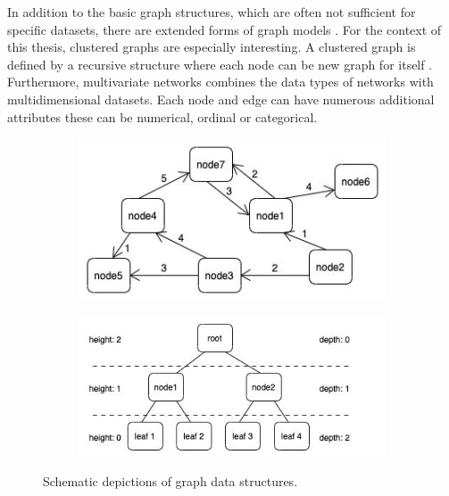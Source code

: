 In addition to the basic graph structures, which are often not sufficient for specific datasets, there are extended forms of graph models \cite{bertault_algorithm_1999}. 
For the context of this thesis, clustered graphs are especially interesting. A clustered graph is defined by a recursive structure where each node can be new graph for itself \cite{eades_multilevel_1997}.\\ 
Furthermore, multivariate networks \cite{kerren_introduction_2014} combines the data types of networks with multidimensional datasets. Each node and edge can have numerous additional attributes these can be numerical, ordinal or categorical.

\begin{figure}[h]
    \centering
    \begin{subfigure}[b]{0.45\columnwidth}
        \centering
        \includegraphics[width=\textwidth]{graphics/weightedDirectedNetwork.jpg}
        \label{fig:simple_weighted_directed_network}
    \end{subfigure}
    \begin{subfigure}[b]{0.54\columnwidth}
        \centering
        \includegraphics[width=\textwidth]{graphics/basicTree.jpg}
        \label{fig:simple_tree}
    \end{subfigure}
    
    \caption{Schematic depictions of graph data structures.} %
    \label{fig:intro} 
  \end{figure}

